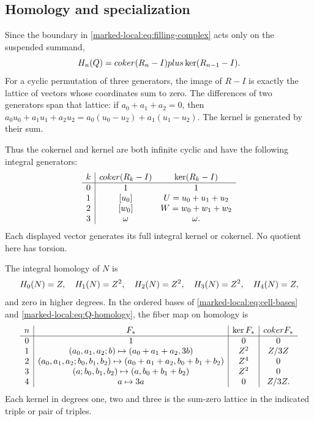 \subsection{Homology and specialization}

Since the boundary in
\eqref{marked-local:eq:filling-complex} acts only on the suspended summand,
\begin{equation}\label{marked-local:eq:Q-homology}
 H_n(Q)=coker(R_n-I)plus\ker(R_{n-1}-I).
\end{equation}
For a cyclic permutation of three generators, the image of $R-I$
is exactly the lattice of vectors whose coordinates sum to zero.
The differences of two generators span that lattice: if
$a_0+a_1+a_2=0$, then
$a_0u_0+a_1u_1+a_2u_2=a_0(u_0-u_2)+a_1(u_1-u_2)$.
The kernel is generated by their sum.

Thus the cokernel and kernel
are both infinite cyclic and have the following integral generators:
\[
 \begin{array}{c|cc}
 k&coker(R_k-I)&\ker(R_k-I)\\ \hline
 0&1&1\\
 1&[u_0]&U=u_0+u_1+u_2\\
 2&[w_0]&W=w_0+w_1+w_2\\
 3&\omega&\omega.
 \end{array}
\]
Each displayed vector generates its full integral kernel or cokernel.
No quotient here has torsion.

\begin{theorem}\label{marked-local:thm:homology}
The integral homology of $N$ is
\[
 H_0(N)=Z,\quad H_1(N)=Z^2,\quad H_2(N)=Z^2,
 \quad H_3(N)=Z^2,\quad H_4(N)=Z,
\]
and zero in higher degrees. In the ordered bases of
\eqref{marked-local:eq:cell-bases} and \eqref{marked-local:eq:Q-homology}, the fiber map on
homology is
\begin{equation}\label{marked-local:eq:F-homology}
\begin{array}{c|c|c|c}
 n&F_*&\ker F_*&coker F_*\\ \hline
 0&1&0&0\\
 1&(a_0,a_1,a_2;b)\mapsto(a_0+a_1+a_2,3b)&Z^2&Z/3Z\\
 2&(a_0,a_1,a_2;b_0,b_1,b_2)\mapsto
       (a_0+a_1+a_2,b_0+b_1+b_2)&Z^4&0\\
 3&(a;b_0,b_1,b_2)\mapsto(a,b_0+b_1+b_2)&Z^2&0\\
 4&a\mapsto3a&0&Z/3Z.
\end{array}
\end{equation}
Each kernel in degrees one, two and three is the sum-zero lattice
in the indicated triple or pair of triples.
\end{theorem}

